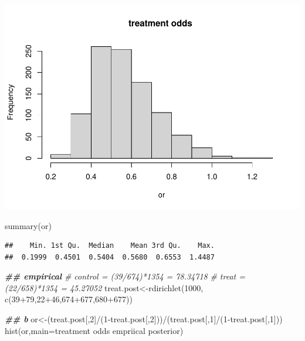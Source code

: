 \documentclass[
]{book}
\newenvironment{Shaded}{\begin{snugshade}}{\end{snugshade}}
\newcommand{\AttributeTok}[1]{\textcolor[rgb]{0.77,0.63,0.00}{#1}}
\newcommand{\CommentTok}[1]{\textcolor[rgb]{0.56,0.35,0.01}{\textit{#1}}}
\newcommand{\DecValTok}[1]{\textcolor[rgb]{0.00,0.00,0.81}{#1}}
\newcommand{\DocumentationTok}[1]{\textcolor[rgb]{0.56,0.35,0.01}{\textbf{\textit{#1}}}}
\newcommand{\FunctionTok}[1]{\textcolor[rgb]{0.00,0.00,0.00}{#1}}
\newcommand{\NormalTok}[1]{#1}
\newcommand{\OtherTok}[1]{\textcolor[rgb]{0.56,0.35,0.01}{#1}}
\newcommand{\SpecialCharTok}[1]{\textcolor[rgb]{0.00,0.00,0.00}{#1}}
\newcommand{\StringTok}[1]{\textcolor[rgb]{0.31,0.60,0.02}{#1}}
\theoremstyle{definition}
\theoremstyle{definition}
\theoremstyle{definition}
\theoremstyle{definition}
\theoremstyle{remark}
\begin{document}
\includegraphics{_main_files/figure-latex/unnamed-chunk-38-1.pdf}

\begin{Shaded}
\begin{Highlighting}[]
  \FunctionTok{summary}\NormalTok{(or)}
\end{Highlighting}
\end{Shaded}

\begin{verbatim}
##    Min. 1st Qu.  Median    Mean 3rd Qu.    Max. 
##  0.1999  0.4501  0.5404  0.5680  0.6553  1.4487
\end{verbatim}

\begin{Shaded}
\begin{Highlighting}[]
  \DocumentationTok{\#\# empirical}
  \CommentTok{\# control = (39/674)*1354 = 78.34718}
  \CommentTok{\# treat = (22/658)*1354 = 45.27052}
\NormalTok{  treat.post}\OtherTok{\textless{}{-}}\FunctionTok{rdirichlet}\NormalTok{(}\DecValTok{1000}\NormalTok{, }\FunctionTok{c}\NormalTok{(}\DecValTok{39}\SpecialCharTok{+}\DecValTok{79}\NormalTok{,}\DecValTok{22}\SpecialCharTok{+}\DecValTok{46}\NormalTok{,}\DecValTok{674}\SpecialCharTok{+}\DecValTok{677}\NormalTok{,}\DecValTok{680}\SpecialCharTok{+}\DecValTok{677}\NormalTok{))}
 
  
  \DocumentationTok{\#\# b}
\NormalTok{  or}\OtherTok{\textless{}{-}}\NormalTok{(treat.post[,}\DecValTok{2}\NormalTok{]}\SpecialCharTok{/}\NormalTok{(}\DecValTok{1}\SpecialCharTok{{-}}\NormalTok{treat.post[,}\DecValTok{2}\NormalTok{]))}\SpecialCharTok{/}\NormalTok{(treat.post[,}\DecValTok{1}\NormalTok{]}\SpecialCharTok{/}\NormalTok{(}\DecValTok{1}\SpecialCharTok{{-}}\NormalTok{treat.post[,}\DecValTok{1}\NormalTok{]))}
  \FunctionTok{hist}\NormalTok{(or,}\AttributeTok{main=}\StringTok{\textquotesingle{}treatment odds empriical posterior\textquotesingle{}}\NormalTok{)}
\end{Highlighting}
\end{Shaded}
\end{document}
